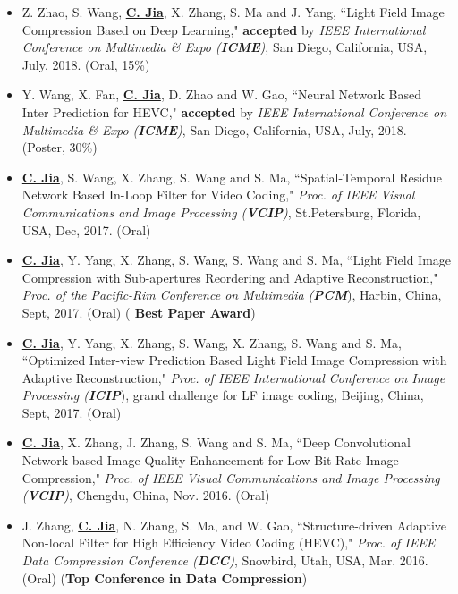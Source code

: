 \documentclass[margin, 10pt]{res} %
\begin{document}
\begin{resume}
\begin{itemize}
\item{Z. Zhao, S. Wang, \underline{\bf C. Jia}, X. Zhang, S. Ma and J. Yang, ``Light Field Image Compression Based on Deep Learning," {\bf accepted} by {\em IEEE International Conference on Multimedia \& Expo ({\bf ICME})}, San Diego, California, USA, July, 2018. (Oral, 15\%)}

\item{Y. Wang, X. Fan, \underline{\bf C. Jia}, D. Zhao and W. Gao, ``Neural Network Based Inter Prediction for HEVC," {\bf accepted} by {\em IEEE International Conference on Multimedia \& Expo ({\bf ICME})}, San Diego, California, USA, July, 2018. (Poster, 30\%)}

\item{\underline{\bf C. Jia}, S. Wang, X. Zhang, S. Wang and S. Ma, ``Spatial-Temporal Residue Network Based In-Loop Filter for Video Coding," {\em Proc. of IEEE Visual Communications and Image Processing ({\bf VCIP})}, St.Petersburg, Florida, USA, Dec, 2017. (Oral)}

\item{\underline{\bf C. Jia}, Y. Yang, X. Zhang, S. Wang, S. Wang and S. Ma, ``Light Field Image Compression with Sub-apertures Reordering and Adaptive Reconstruction," {\em Proc. of the Pacific-Rim Conference on Multimedia ({\bf PCM}}), Harbin, China, Sept, 2017. (Oral)} ({\bf{\color{red} Best Paper Award}})

\item{\underline{\bf C. Jia}, Y. Yang, X. Zhang, S. Wang, X. Zhang, S. Wang and S. Ma, ``Optimized Inter-view Prediction Based Light Field Image Compression with Adaptive Reconstruction," {\em Proc. of IEEE International Conference on Image Processing ({\bf ICIP}}), grand challenge for LF image coding, Beijing, China, Sept, 2017. (Oral)}

\item{\underline{\bf C. Jia}, X. Zhang, J. Zhang, S. Wang and S. Ma, ``Deep Convolutional Network based Image Quality Enhancement for Low Bit Rate Image Compression," {\em Proc. of IEEE Visual Communications and Image Processing ({\bf VCIP})}, Chengdu, China, Nov. 2016. (Oral)}

\item{J. Zhang, \underline{\bf C. Jia},  N. Zhang, S. Ma, and W. Gao, ``Structure-driven Adaptive Non-local Filter for High Efficiency Video Coding (HEVC)," {\em Proc. of IEEE Data Compression Conference ({\bf DCC})}, Snowbird, Utah, USA, Mar. 2016. (Oral) ({\bf Top Conference in Data Compression})}


\end{itemize}
\end{resume}
\end{document}
